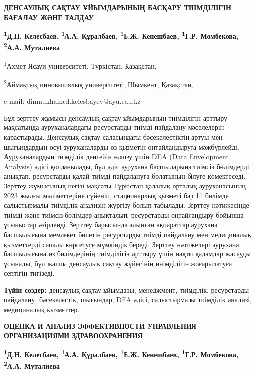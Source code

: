 \begin{articleheader}
{\bfseries ДЕНСАУЛЫҚ САҚТАУ ҰЙЫМДАРЫНЫҢ БАСҚАРУ ТИІМДІЛІГІН БАҒАЛАУ ЖӘНЕ ТАЛДАУ}

{\bfseries
\textsuperscript{1}Д.Н. Келесбаев\textsuperscript{\envelope },
\textsuperscript{1}А.А. Құралбаев,
\textsuperscript{1}Б.Ж. Кенешбаев,
\textsuperscript{1}Г.Р. Момбекова,
\textsuperscript{2}А.А. Муталиева
}
\end{articleheader}

\begin{affiliation}
\textsuperscript{1}Ахмет Ясауи университеті, Түркістан, Қазақстан,

\textsuperscript{2}Аймақтық инновациялық университеті, Шымкент, Қазақстан,

e-mail: dinmukhamed.kelesbayev@ayu.edu.kz
\end{affiliation}

Бұл зерттеу жұмысы денсаулық сақтау ұйымдарының тиімділігін арттыру
мақсатында ауруханалардағы ресурстарды тиімді пайдалану мәселелерін
қарастырады. Денсаулық сақтау саласындағы бәсекелестіктің артуы мен
шығындардың өсуі ауруханаларды өз қызметін оңтайландыруға мәжбүрлейді.
Ауруханалардың тиімділік деңгейін өлшеу үшін DEA (Data Envelopment
Analysis) әдісі қолданылады, бұл әдіс аурухана басшыларына тиімсіз
бөлімдерді анықтап, ресурстарды қалай тиімді пайдалануға болатынын
білуге көмектеседі. Зерттеу жұмысының негізі мақсаты Түркістан қалалық
орталық ауруханасының 2023 жылғы мәліметтеріне сүйеніп, стационарлық
қызметі бар 11 бөлімде салыстырмалы тиімділік анализін жүргізу болып
табылады. Зерттеу нәтижесінде тиімді және тиімсіз бөлімдер анықталып,
ресурстарды оңтайландыру бойынша ұсыныстар әзірленді. Зерттеу барысында
алынған ақпараттар аурухана басшылығына мемлекет бөлетін ресурстарды
тиімді пайдалану мен медициналық қызметтерді сапалы көрсетуге мүмкіндік
береді. Зерттеу нәтижелері аурухана басшылығына өз бөлімдерінің
тиімділігін арттыру үшін нақты қадамдар жасауды ұсынады, бұл жалпы
денсаулық сақтау жүйесінің өнімділігін жоғарылатуға септігін тигізеді.

{\bfseries Түйін сөздер:} денсаулық сақтау ұйымдары, менеджмент, тиімділік,
ресурстарды пайдалану, бәсекелестік, шығындар, DEA әдісі, салыстырмалы
тиімділік анализі, медициналық қызметтер.

\begin{articleheader}
{\bfseries ОЦЕНКА И АНАЛИЗ ЭФФЕКТИВНОСТИ УПРАВЛЕНИЯ ОРГАНИЗАЦИЯМИ ЗДРАВООХРАНЕНИЯ}

{\bfseries
\textsuperscript{1}Д.Н. Келесбаев\textsuperscript{\envelope },
\textsuperscript{1}А.А. Құралбаев,
\textsuperscript{1}Б.Ж. Кенешбаев,
\textsuperscript{1}Г.Р. Момбекова,
\textsuperscript{2}А.А. Муталиева
}
\end{articleheader}

